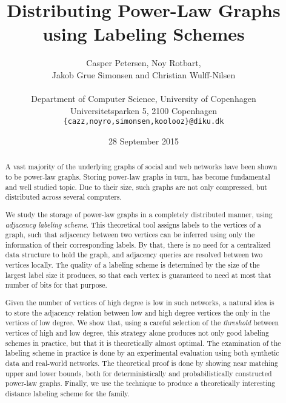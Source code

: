 \documentclass{acm_proc_article-sp}
\begin{document}
\title{Distributing Power-Law Graphs using Labeling Schemes}

\author{Casper Petersen, Noy Rotbart,\\ Jakob Grue Simonsen and Christian Wulff-Nilsen \\ \\
\small{Department of Computer Science, University of Copenhagen} \\
\small{Universitetsparken 5, 2100 Copenhagen}\\
 \small{\texttt{\{cazz,noyro,simonsen,koolooz\}@diku.dk}}  }
 

\date{28 September 2015}
\maketitle
\begin{abstract}
A vast majority of  the underlying graphs of social and web networks  have been shown to be power-law graphs.
Storing  power-law graphs in turn, has become   fundamental and  well studied topic.
Due to their size, such graphs are not only compressed, but distributed across several computers.

We study the storage of  power-law graphs in a completely distributed manner, using  \emph{adjacency labeling scheme}.
This theoretical tool assigns  labels to the vertices of a graph, such that   adjacency between two vertices can be inferred using only the information of their corresponding labels. By that, there is no need for a centralized data structure to hold the graph, and adjacency queries are resolved between two vertices locally. The quality of a labeling scheme is determined by the size of the largest label size it produces, so that each vertex is guaranteed to need at most that number of bits for that purpose.

Given the number of vertices of high degree is low in such networks, a natural idea is to store the adjacency relation between low and high degree vertices the only in the vertices of  low degree. 
We show that, using  a careful selection of the \emph{threshold} between vertices of high and low degree, this strategy alone produces not only good labeling schemes in practice, but that it is theoretically almost optimal. 
The examination of the labeling scheme in practice is done by an experimental evaluation using both synthetic data and real-world networks.
The theoretical proof is done by showing near matching upper and lower bounds, both for deterministically and probabilistically  constructed power-law graphs.
Finally, we use the  technique  to produce a  theoretically interesting distance labeling scheme for the family.
\end{abstract}
\end{document}
